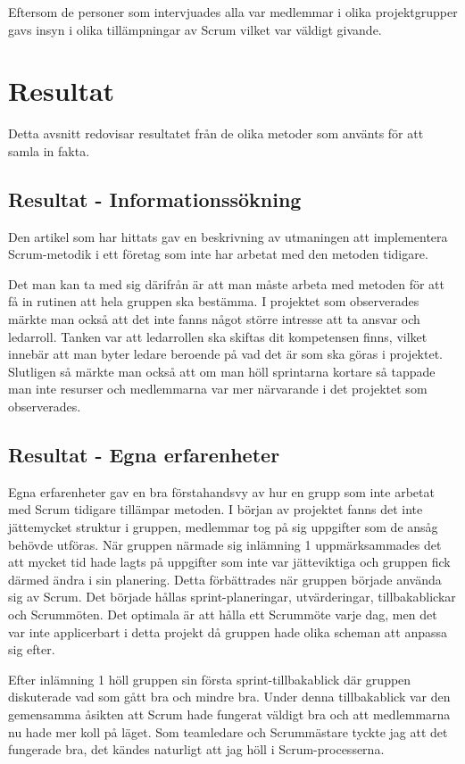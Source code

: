 Eftersom de personer som intervjuades alla var medlemmar i olika projektgrupper gavs insyn i olika tillämpningar av Scrum vilket var väldigt givande.

\section{Resultat}
Detta avsnitt redovisar resultatet från de olika metoder som använts för att samla in fakta.

\subsection{Resultat - Informationssökning}
Den artikel som har hittats gav en beskrivning av utmaningen att implementera Scrum-metodik i ett företag som inte har arbetat med den metoden tidigare. 

Det man kan ta med sig därifrån är att man måste arbeta med metoden för att få in rutinen att hela gruppen ska bestämma. 
I projektet som observerades märkte man också att det inte fanns något större intresse att ta ansvar och ledarroll.
Tanken var att ledarrollen ska skiftas dit kompetensen finns, vilket innebär att man byter ledare beroende på vad det är som ska göras i projektet. 
Slutligen så märkte man också att om man höll sprintarna kortare så tappade man inte resurser och medlemmarna var mer närvarande i det projektet som observerades.

\subsection{Resultat - Egna erfarenheter}
Egna erfarenheter gav en bra förstahandsvy av hur en grupp som inte arbetat med Scrum tidigare tillämpar metoden. 
I början av projektet fanns det inte jättemycket struktur i gruppen, medlemmar tog på sig uppgifter som de ansåg behövde utföras. 
När gruppen närmade sig inlämning 1 uppmärksammades det att mycket tid hade lagts på uppgifter som inte var jätteviktiga och gruppen fick därmed ändra i sin planering.
Detta förbättrades när gruppen började använda sig av Scrum. 
Det började hållas sprint-planeringar, utvärderingar, tillbakablickar och Scrummöten. Det optimala är att hålla ett Scrummöte varje dag, men det var inte applicerbart i detta projekt då gruppen hade olika scheman att anpassa sig efter. 

Efter inlämning 1 höll gruppen sin första sprint-tillbakablick där gruppen diskuterade vad som gått bra och mindre bra. 
Under denna tillbakablick var den gemensamma åsikten att Scrum hade fungerat väldigt bra och att medlemmarna nu hade mer koll på läget. 
Som teamledare och Scrummästare tyckte jag att det fungerade bra, det kändes naturligt att jag höll i Scrum-processerna. 

